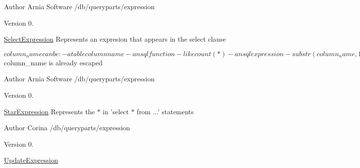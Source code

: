 \begin{DoxyAuthor}{Author}
Arnia Software /db/queryparts/expression 
\end{DoxyAuthor}
\begin{DoxyVersion}{Version}
0.
\end{DoxyVersion}
\hyperlink{classSelectExpression}{Select\-Expression} Represents an expresion that appears in the select clause \begin{DoxyVerb}    $column_name can be:
    - a table column name
    - an sql function - like count(*)
        - an sql expression - substr(column_name, 1, 8) or score1 + score2
    $column_name is already escaped
\end{DoxyVerb}


\begin{DoxyAuthor}{Author}
Arnia Software /db/queryparts/expression 
\end{DoxyAuthor}
\begin{DoxyVersion}{Version}
0.
\end{DoxyVersion}
\hyperlink{classStarExpression}{Star\-Expression} Represents the $\ast$ in 'select $\ast$ from ...' statements

\begin{DoxyAuthor}{Author}
Corina /db/queryparts/expression 
\end{DoxyAuthor}
\begin{DoxyVersion}{Version}
0.
\end{DoxyVersion}
\hyperlink{classUpdateExpression}{Update\-Expression}

